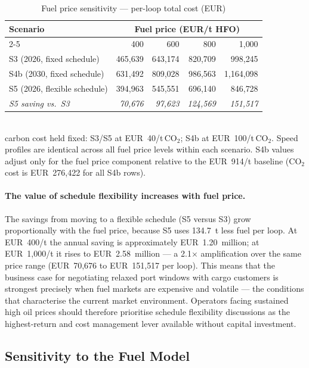 \begin{table}[h]
\centering
\caption{Fuel price sensitivity --- per-loop total cost (EUR)}
\label{tab:fuel_sensitivity}
\begin{tabular}{lrrrr}
  \toprule
  Scenario & \multicolumn{4}{c}{Fuel price (EUR/t HFO)} \\
  \cmidrule(lr){2-5}
  & 400 & 600 & 800 & 1{,}000 \\
  \midrule
  S3  (2026, fixed schedule)   & 465{,}639 & 643{,}174 & 820{,}709 & 998{,}245 \\
  S4b (2030, fixed schedule)   & 631{,}492 & 809{,}028 & 986{,}563 & 1{,}164{,}098 \\
  S5  (2026, flexible schedule)& 394{,}963 & 545{,}551 & 696{,}140 & 846{,}728 \\
  \midrule
  \textit{S5 saving vs.\ S3}   & \textit{70{,}676} & \textit{97{,}623} & \textit{124{,}569} & \textit{151{,}517} \\
  \bottomrule
\end{tabular}
\smallskip\\
{\footnotesize \ETS{} carbon cost held fixed: S3/S5 at EUR~40/t\,CO$_2$;
S4b at EUR~100/t\,CO$_2$.  Speed profiles are identical across all fuel
price levels within each scenario.
S4b values adjust only for the fuel price component relative to the
EUR~914/t baseline (CO$_2$ cost is EUR~276{,}422 for all S4b rows).}
\end{table}

\paragraph{The value of schedule flexibility increases with fuel price.}
The savings from moving to a flexible schedule (S5 versus S3) grow
proportionally with the fuel price, because S5 uses 134.7~t less fuel per
loop.  At EUR~400/t the annual saving is approximately EUR~1.20~million;
at EUR~1{,}000/t it rises to EUR~2.58~million --- a 2.1$\times$ amplification
over the same price range (EUR~70{,}676 to EUR~151{,}517 per loop).  This means that the business case for negotiating
relaxed port windows with cargo customers is strongest precisely when fuel
markets are expensive and volatile --- the conditions that characterise the
current market environment.  Operators facing sustained high oil prices should
therefore prioritise schedule flexibility discussions as the highest-return
\CII{} and cost management lever available without capital investment.

\subsection{Sensitivity to the Fuel Model}
\label{sec:disc:fuelmodel}

